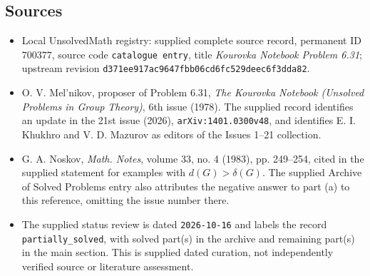 \documentclass[11pt]{article}
\begin{document}
\subsection{Sources}
\begin{itemize}
\item Local UnsolvedMath registry: supplied complete source record, permanent ID \(700377\), source code \texttt{catalogue entry}, title \emph{Kourovka Notebook Problem 6.31}; upstream revision \texttt{d371ee917ac9647fbb06cd6fc529deec6f3dda82}.
\item O. V. Mel'nikov, proposer of Problem 6.31, \emph{The Kourovka Notebook (Unsolved Problems in Group Theory)}, 6th issue (1978). The supplied record identifies an update in the 21st issue (2026), \texttt{arXiv:1401.0300v48}, and identifies E. I. Khukhro and V. D. Mazurov as editors of the Issues 1--21 collection.
\item G. A. Noskov, \emph{Math. Notes}, volume 33, no. 4 (1983), pp. 249--254, cited in the supplied statement for examples with \(d(G)>\delta(G)\). The supplied Archive of Solved Problems entry also attributes the negative answer to part (a) to this reference, omitting the issue number there.
\item The supplied status review is dated \texttt{2026-10-16} and labels the record \texttt{partially\_solved}, with solved part(s) in the archive and remaining part(s) in the main section. This is supplied dated curation, not independently verified source or literature assessment.
\end{itemize}
\end{document}
